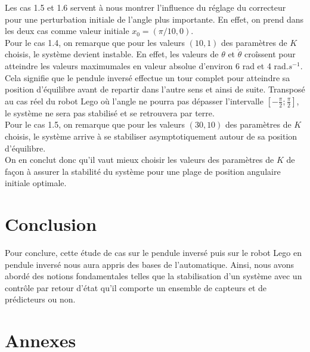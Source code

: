 \documentclass[a4paper]{article}
\begin{document}
                        Les cas 1.5 et 1.6 servent à nous montrer l'influence du réglage du correcteur pour une perturbation initiale de l'angle plus importante.
                        En effet, on prend dans les deux cas comme valeur initiale $x_0 = (\pi/10, 0)$. \\

                        Pour le cas 1.4, on remarque que pour les valeurs $(10,1)$ des paramètres de $K$ choisis, le système devient instable.
                        En effet, les valeurs de $\theta$ et $\dot \theta$ croîssent pour atteindre les valeurs maximumales en valeur absolue 
                        d'environ 6 rad et 4 rad.$s^{-1}$.
                        Cela signifie que le pendule inversé effectue un tour complet pour atteindre sa position d'équilibre avant de repartir
                        dans l'autre sens et ainsi de suite.
                        Transposé au cas réel du robot Lego où l'angle ne pourra pas dépasser l'intervalle $\left[ -\frac{\pi}{2} ; \frac{\pi}{2} \right]$,
                        le système ne sera pas stabilisé et se retrouvera par terre. \\

                        Pour le cas 1.5, on remarque que pour les valeurs $(30,10)$ des paramètres de $K$ choisis, le système arrive à se 
                        stabiliser asymptotiquement autour de sa position d'équilibre. \\

                        On en conclut donc qu'il vaut mieux choisir les valeurs des paramètres de $K$ de façon à assurer 
                        la stabilité du système pour une plage de position angulaire initiale optimale.


        \section{Conclusion}

                \hspace{20pt} Pour conclure, cette étude de cas sur le pendule inversé puis sur le robot Lego en pendule inversé nous aura appris des bases de l'automatique.
                Ainsi, nous avons abordé des notions fondamentales telles que la stabilisation d'un système avec un contrôle par retour d'état
                qu'il comporte un ensemble de capteurs et de prédicteurs ou non.


        \newpage
        \section{Annexes}
\end{document}
